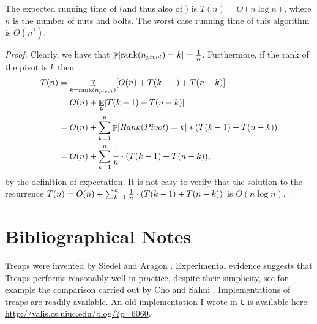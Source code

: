\begin{theorem}
    The expected running time of \MatchNutsAndBolts{} (and thus also
    of \QuickSort{}) is $T(n)=O(n\log n)$, where $n$ is the number of
    nuts and bolts. The worst case running time of this algorithm is
    $O(n^{2})$.
\end{theorem}

\begin{proof}
    Clearly, we have that $\Prob{\Rank(n_{pivot}) = k} = \frac{1}{n}$.
    Furthermore, if the rank of the pivot is $k$ then
    \begin{align*}
      T(n)%
      &=%
        \ExExt{k=\Rank(n_{pivot})}{ O(n)+T(k-1)+T(n-k) }
      \\&=%
        O(n) + \ExExt{k}{ T(k-1) + T(n-k)}%
      \\&%
      =%
      O(n)+\sum_{k=1}^{n}\Prob{Rank(Pivot)=k}
      *\pth{T(k-1)+T(n-k)}%
      \\&%
      =%
      O(n)+\sum_{k=1}^{n}\frac{1}{n}\cdot\pth{T(k-1)+T(n-k)},
    \end{align*}
    by the definition of expectation. It is not easy to verify that
    the solution to the recurrence
    $T(n)=O(n)+\sum_{k=1}^{n}\frac{1}{n}\cdot\pth{T(k-1)+T(n-k)}$
    is $O(n \log n )$.
\end{proof}





\section{Bibliographical Notes}

Treaps were invented by Siedel and Aragon
\cite{sa-rst-96}. Experimental evidence suggests that Treaps performs
reasonably well in practice, despite their simplicity, see for example
the comparison carried out by Cho and Sahni
\cite{cs-nwbbs-00}. Implementations of treaps are readily
available. An old implementation I wrote in \texttt{C} is available
here: \url{http://valis.cs.uiuc.edu/blog/?p=6060}.




\ChapterEnd{}




